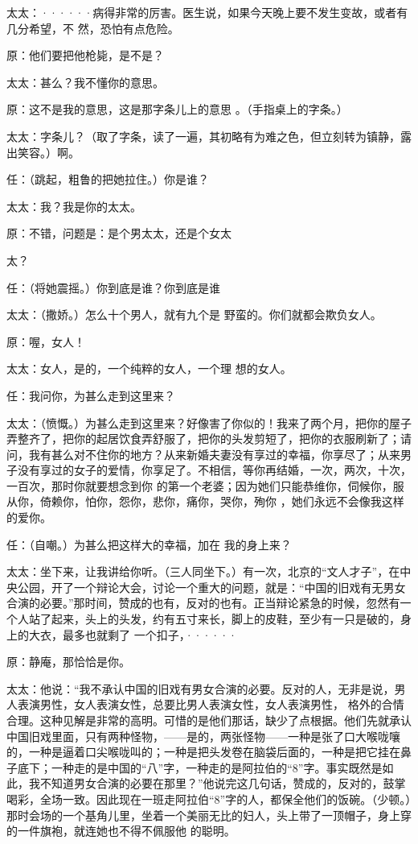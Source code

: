 \documentclass{article}
\begin{document}
太太：······病得非常的厉害。医生说，如果今天晚上要不发生变故，或者有几分希望，不
然，恐怕有点危险。 


原：他们要把他枪毙，是不是？ 


太太：甚么？我不懂你的意思。 

原：这不是我的意思，这是那字条儿上的意思
。（手指桌上的字条。） 

太太：字条儿？（取了字条，读了一遍，其初略有为难之色，但立刻转为镇静，露出笑容。）啊。


任：（跳起，粗鲁的把她拉住。）你是谁？ 


太太：我？我是你的太太。 

原：不错，问题是：是个男太太，还是个女太
\newpage

太？ 

任：（将她震摇。）你到底是谁？你到底是谁

太太：（撒娇。）怎么十个男人，就有九个是
野蛮的。你们就都会欺负女人。 


原：喔，女人！ 

太太：女人，是的，一个纯粹的女人，一个理
想的女人。 


任：我问你，为甚么走到这里来？ 

太太：（愤慨。）为甚么走到这里来？好像害了你似的！我来了两个月，把你的屋子弄整齐了，把你的起居饮食弄舒服了，把你的头发剪短了，把你的衣服刷新了；请问，我有甚么对不住你的地方？从来新婚夫妻没有享过的幸福，你享尽了；从来男子没有享过的女子的爱情，你享足了。不相信，等你再结婚，一次，两次，十次，一百次，那时你就要想念到你
\newpage
的第一个老婆；因为她们只能恭维你，伺候你，服从你，倚赖你，怕你，怨你，悲你，痛你，哭你，殉你
，她们永远不会像我这样的爱你。 

任：（自嘲。）为甚么把这样大的幸福，加在
我的身上来？ 

太太：坐下来，让我讲给你听。（三人同坐下。）有一次，北京的“文人才子”，在中央公园，开了一个辩论大会，讨论一个重大的问题，就是：“中国的旧戏有无男女合演的必要。”那时间，赞成的也有，反对的也有。正当辩论紧急的时候，忽然有一个人站了起来，头上的头发，约有五寸来长，脚上的皮鞋，至少有一只是破的，身上的大衣，最多也就剩了
一个扣子，······ 


原：静庵，那恰恰是你。 

太太：他说：“我不承认中国的旧戏有男女合演的必要。反对的人，无非是说，男人表演男性，女人表演女性，总要比男人表演女性，女人表演男性，
\newpage
格外的合情合理。这种见解是非常的高明。可惜的是他们那话，缺少了点根据。他们先就承认中国旧戏里面，只有两种怪物，——是的，两张怪物——一种是张了口大喉咙嚷的，一种是逼着口尖喉咙叫的；一种是把头发卷在脑袋后面的，一种是把它挂在鼻子底下；一种走的是中国的“八”字，一种走的是阿拉伯的“8”字。事实既然是如此，我不知道男女合演的必要在那里？”他说完这几句话，赞成的，反对的，鼓掌喝彩，全场一致。因此现在一班走阿拉伯“8”字的人，都保全他们的饭碗。（少顿。）那时会场的一个基角儿里，坐着一个美丽无比的妇人，头上带了一顶帽子，身上穿的一件旗袍，就连她也不得不佩服他
的聪明。 
\end{document}
